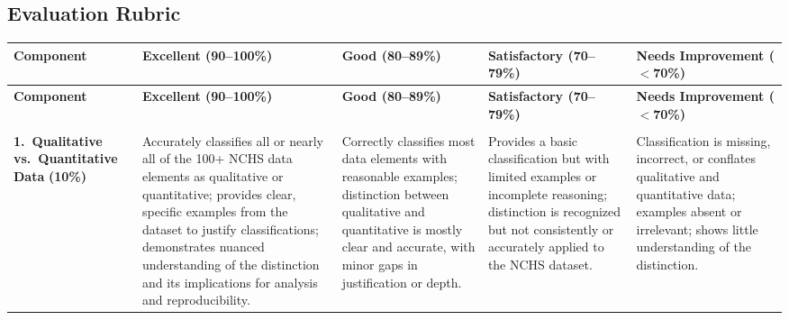 



\begin{landscape}

    \section{Evaluation Rubric}

    {\footnotesize

    \begin{longtable}{%
        >{\RaggedRight\arraybackslash}p{2.5cm}   %
        >{\RaggedRight\arraybackslash}p{4.5cm}   %
        >{\RaggedRight\arraybackslash}p{4.2cm}   %
        >{\RaggedRight\arraybackslash}p{4.2cm}   %
        >{\RaggedRight\arraybackslash}p{4.5cm}}  %

    \toprule
    \textbf{Component} &
    \textbf{Excellent (90--100\%)} &
    \textbf{Good (80--89\%)} &
    \textbf{Satisfactory (70--79\%)} &
    \textbf{Needs Improvement ($<$70\%)} \\
    \midrule
    \endfirsthead

    \toprule
    \textbf{Component} &
    \textbf{Excellent (90--100\%)} &
    \textbf{Good (80--89\%)} &
    \textbf{Satisfactory (70--79\%)} &
    \textbf{Needs Improvement ($<$70\%)} \\
    \midrule
    \endhead

    \midrule
    \multicolumn{5}{r}{\textit{Continued on next page}} \\
    \endfoot

    \bottomrule
    \endlastfoot

    \textbf{1.\ Qualitative vs.\ Quantitative Data}
    \newline\textbf{(10\%)}
    &
    Accurately classifies all or nearly all of the 100+ NCHS data elements as
    qualitative or quantitative; provides clear, specific examples from the
    dataset to justify classifications; demonstrates nuanced understanding of
    the distinction and its implications for analysis and reproducibility.
    &
    Correctly classifies most data elements with reasonable examples;
    distinction between qualitative and quantitative is mostly clear and
    accurate, with minor gaps in justification or depth.
    &
    Provides a basic classification but with limited examples or incomplete
    reasoning; distinction is recognized but not consistently or accurately
    applied to the NCHS dataset.
    &
    Classification is missing, incorrect, or conflates qualitative and
    quantitative data; examples absent or irrelevant; shows little
    understanding of the distinction.
    \\
    \midrule


\end{longtable}}
\end{landscape}
